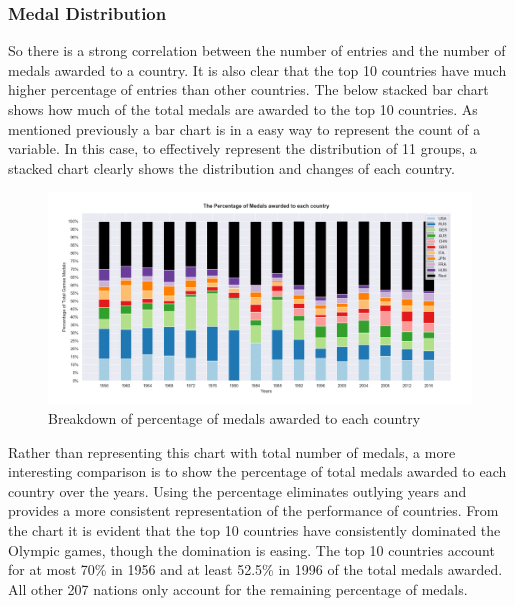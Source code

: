 \documentclass[a4 paper, 12pt]{article}
\begin{document}
 

        \subsubsection{Medal Distribution}
        So there is a strong correlation between the number of entries and the number of medals awarded to a country. It is also clear that the top 10 countries have much higher percentage of entries than other countries. The below stacked bar chart shows how much of the total medals are awarded to the top 10 countries. As mentioned previously a bar chart is in a easy way to represent the count of a variable. In this case, to effectively represent the distribution of 11 groups, a stacked chart clearly shows the distribution and changes of each country.

        \begin{figure} [H]
            \centering
            \includegraphics[width=\textwidth, frame]
                {./images/graph/countries_medals_stacked.png}      
                \caption{Breakdown of percentage of medals awarded to each country} 
        \end{figure}

        Rather than representing this chart with total number of medals, a more interesting comparison is to show the percentage of total medals awarded to each country over the years. Using the percentage eliminates outlying years and provides a more consistent representation of the performance of countries. From the chart it is evident that the top 10 countries have consistently dominated the Olympic games, though the domination is easing. The top 10 countries account for at most 70\% in 1956 and at least 52.5\% in 1996 of the total medals awarded. All other 207 nations only account for the remaining percentage of medals. 
\end{document}
